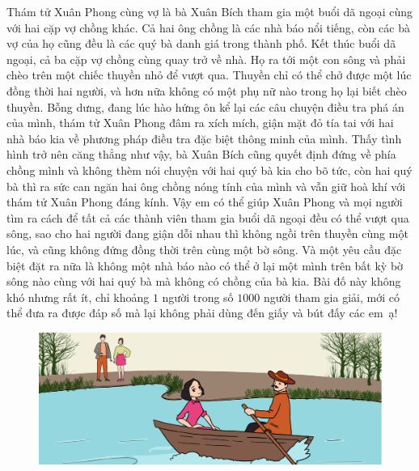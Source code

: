 \begin{multicols}{2}
	Thám tử Xuân Phong cùng vợ là bà Xuân Bích tham gia một buổi dã ngoại cùng với hai cặp vợ chồng khác. Cả hai ông chồng là các nhà báo nổi tiếng, còn các bà vợ của họ cũng đều là các quý bà danh giá trong thành phố. Kết thúc buổi dã ngoại, cả ba cặp vợ chồng cùng quay trở về nhà. Họ ra tới một con sông và  phải chèo trên một chiếc thuyền nhỏ để vượt qua. Thuyền chỉ có thể chở được một lúc đồng thời hai người, và hơn nữa không có một phụ nữ nào trong họ lại biết chèo thuyền.
	\vskip 0.1cm
	Bỗng dưng, đang lúc hào hứng ôn kể lại các câu chuyện điều tra phá án của mình, thám tử Xuân Phong đâm ra xích mích, giận mặt đỏ tía tai với hai nhà báo kia về phương pháp điều tra đặc biệt thông minh của mình. Thấy tình hình trở nên căng thẳng như vậy, bà Xuân Bích cũng quyết định đứng về phía chồng mình và không thèm nói chuyện với hai quý bà kia cho bõ tức, còn hai quý bà thì ra sức can ngăn hai ông chồng nóng tính của mình và vẫn giữ hoà khí với thám tử Xuân Phong đáng kính.
	\vskip 0.1cm
	Vậy em có thể giúp Xuân Phong và mọi người tìm ra cách để tất cả các thành viên tham gia buổi dã ngoại đều có thể vượt qua sông, sao cho hai người đang giận dỗi nhau thì không ngồi trên thuyền cùng một lúc, và cũng không đứng đồng thời trên cùng một bờ sông. Và một yêu cầu đặc biệt đặt ra nữa là không một nhà báo nào có thể ở lại một mình trên bất kỳ bờ sông nào cùng với hai quý bà mà không có chồng của bà kia. 
	\vskip 0.1cm
	Bài đố này không khó nhưng rất ít, chỉ khoảng $1$ người trong số $1000$ người tham gia giải, mới có thể đưa ra được đáp số mà lại không phải dùng đến giấy và bút đấy các em~ạ!
\end{multicols}
	\begin{figure}[H]
	\centering
	\vspace*{-8pt}
	\captionsetup{labelformat= empty, justification=centering}
	\includegraphics[width=1\linewidth]{xuanphong}
	\vspace*{-10pt}
\end{figure}
\newpage
\begingroup
